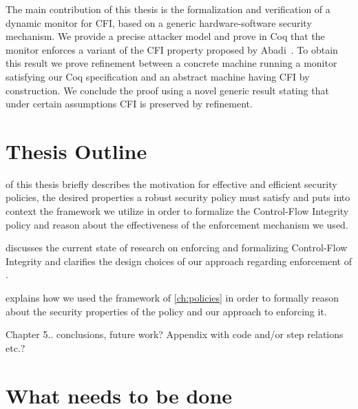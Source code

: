 The main contribution of this thesis is the formalization and
verification of a dynamic monitor for CFI, based on a generic
hardware-software security mechanism.
%
We provide a precise attacker model and prove in Coq that the monitor
enforces a variant of the CFI property proposed by
Abadi~\ETAL\cite{AbadiBEL09}.
%
To obtain this result we prove refinement between a concrete
machine running a monitor satisfying our Coq specification
and an abstract machine having CFI by construction.
%
We conclude the proof using a novel generic result stating that under
certain assumptions CFI is preserved by refinement.

\section{Thesis Outline}\label{sec:outline}
 of this thesis briefly describes the motivation for
effective and efficient security policies, the desired properties a
robust security policy must satisfy and puts into context the
framework we utilize in order to formalize the Control-Flow Integrity policy
and reason about the effectiveness of the enforcement mechanism we used.

 discusses the current state of
research on enforcing and formalizing Control-Flow Integrity and clarifies
the design choices of our approach regarding enforcement of \CFI.

 explains how we used the framework of \cref{ch:policies}
in order to formally reason about the security properties of the \CFI policy and
our approach to enforcing it.

Chapter 5.. conclusions, future work? Appendix with code and/or step
relations etc.?

\section{What needs to be done}

